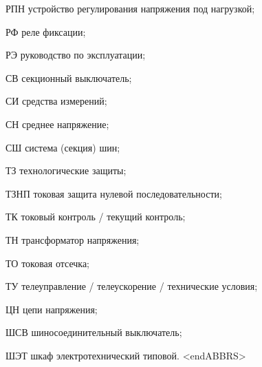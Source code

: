 \begin{list}{}
\item[РПН] устройство регулирования напряжения под нагрузкой;
\item[РФ] реле фиксации;
\item[РЭ] руководство по эксплуатации;
\item[СВ] секционный выключатель;
\item[СИ] средства измерений;
\item[СН] среднее напряжение;
\item[СШ] система (секция) шин;
\item[ТЗ] технологические защиты;
\item[ТЗНП] токовая защита нулевой последовательности;
\item[ТК] токовый контроль / текущий контроль;
\item[ТН] трансформатор напряжения;
\item[ТО] токовая отсечка;
\item[ТУ] телеуправление / телеускорение / технические условия;
\item[ЦН] цепи напряжения;
\item[ШСВ] шиносоединительный выключатель;
\item[ШЭТ] шкаф электротехнический типовой.
{\color{white}\fontsize{0.1pt}{0.1pt}\selectfont<endABBRS>}
\end{list}
